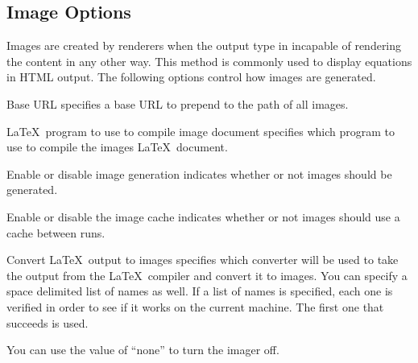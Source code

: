 \subsection{Image Options\label{sec:config-images}}

Images are created by renderers when the output type in incapable of 
rendering the content in any other way.  This method is commonly used
to display equations in HTML output.  The following options control
how images are generated.

\begin{configuration}{Base URL}
specifies a base URL to prepend to the path of all images.
\end{configuration}

\begin{configuration}{\LaTeX\ program to use to compile image document}
specifies which program to use to compile the images \LaTeX\ document.
\end{configuration}

\begin{configuration}{Enable or disable image generation}
indicates whether or not images should be generated.
\end{configuration}

\begin{configuration}{Enable or disable the image cache}
indicates whether or not images should use a cache between runs.
\end{configuration}

\begin{configuration}{Convert \LaTeX\ output to images}
specifies which converter will be used to take the output from the
\LaTeX\ compiler and convert it to images.  You can specify a space 
delimited list of names as well.  If a list of names is specified, 
each one is verified in order to see if it works on the current machine.
The first one that succeeds is used.

You can use the value of ``none'' to turn the imager off.
\end{configuration}

